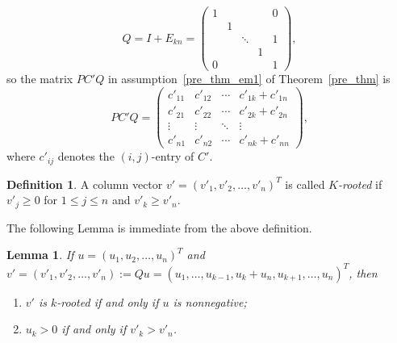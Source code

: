 \documentclass[12pt, a4paper]{article}
\theoremstyle{plain}
\newtheorem{lem}[thm]{Lemma}
\theoremstyle{definition}
\newtheorem{defn}[thm]{Definition}
\begin{document}
\begin{equation} \label{Q_1}
Q=I+E_{kn}=\begin{pmatrix}
1 &   &         &   & 0 \\
  & 1 &         &   &   \\
  &   & \ddots  &   & 1 \\
  &   &         & 1 &  \\
0 &   &         &     & 1
\end{pmatrix},
\end{equation}
so the matrix $PC'Q$ in assumption~\ref{pre_thm_em1} of Theorem~\ref{pre_thm} is
\begin{equation}\label{PC'Q}
  PC'Q=\begin{pmatrix}
         c'_{11} & c'_{12} & \cdots &  c'_{1k}+c'_{1n} \\
         c'_{21} & c'_{22} & \cdots &  c'_{2k}+c'_{2n} \\
         \vdots & \vdots & \ddots &  \vdots \\
         c'_{n1} & c'_{n2} & \cdots &  c'_{nk}+c'_{nn}
       \end{pmatrix},
\end{equation}
where $c'_{ij}$ denotes the $(i,j)$-entry of $C'$.






\begin{defn}%
A column vector $v'=(v'_1,v'_2,\ldots,v'_n)^T$ is called {\it $K$-rooted}  if $v'_{j} \geq 0$ for $1 \leq  j \leq n$ and $v'_k\geq v'_n.$
\end{defn}

The following Lemma is immediate from the above definition.%

\begin{lem}\label{lem:rt_vec}
If $u=(u_1, u_2, \ldots, u_n)^T$ and $v'=(v'_1, v'_2, \ldots, v'_n):=Qu=(u_1,\ldots, u_{k-1},u_k+u_n, u_{k+1}, \ldots,  u_n)^T$, then
\begin{enumerate}[label=(\roman*)]
\item \label{lem:rt_vec:en1}$v'$ is $k$-rooted  if and only if $u$ is nonnegative;
\item $u_k>0$ if and only if $v'_k>v'_n$.
\end{enumerate}
\end{lem}
\end{document}
